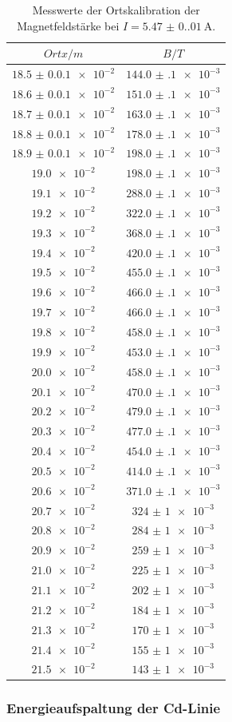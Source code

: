 \begin{table}[H]
	\centering
	\begin{tabular}{|c|c|} \hline
		$Ort x / m$           & $B / T$               \\ \hline
		$\num{18.5(0.01)e-2}$ & $\num{144.0(1)e-3}$   \\
		$\num{18.6(0.01)e-2}$ & $\num{151.0(1)e-3}$   \\
		$\num{18.7(0.01)e-2}$ & $\num{163.0(1)e-3}$   \\
		$\num{18.8(0.01)e-2}$ & $\num{178.0(1)e-3}$   \\
		$\num{18.9(0.01)e-2}$ & $\num{198.0(1)e-3}$   \\
		$\num{19.0e-2} $      & $ \num{198.0(1)e-3} $ \\
		$\num{19.1e-2} $      & $ \num{288.0(1)e-3} $ \\
		$\num{19.2e-2} $      & $ \num{322.0(1)e-3} $ \\
		$\num{19.3e-2} $      & $ \num{368.0(1)e-3} $ \\
		$\num{19.4e-2} $      & $ \num{420.0(1)e-3} $ \\
		$\num{19.5e-2} $      & $ \num{455.0(1)e-3} $ \\
		$\num{19.6e-2} $      & $ \num{466.0(1)e-3} $ \\
		$\num{19.7e-2} $      & $ \num{466.0(1)e-3} $ \\
		$\num{19.8e-2} $      & $ \num{458.0(1)e-3} $ \\
		$\num{19.9e-2} $      & $ \num{453.0(1)e-3} $ \\
		$\num{20.0e-2} $      & $ \num{458.0(1)e-3} $ \\
		$\num{20.1e-2} $      & $ \num{470.0(1)e-3} $ \\
		$\num{20.2e-2} $      & $ \num{479.0(1)e-3} $ \\
		$\num{20.3e-2} $      & $ \num{477.0(1)e-3} $ \\
		$\num{20.4e-2} $      & $ \num{454.0(1)e-3} $ \\
		$\num{20.5e-2} $      & $ \num{414.0(1)e-3} $ \\
		$\num{20.6e-2} $      & $ \num{371.0(1)e-3} $ \\
		$\num{20.7e-2} $      & $ \num{324(1)e-3} $   \\
		$\num{20.8e-2} $      & $ \num{284(1)e-3} $   \\
		$\num{20.9e-2} $      & $ \num{259(1)e-3} $   \\
		$\num{21.0e-2} $      & $ \num{225(1)e-3} $   \\
		$\num{21.1e-2} $      & $ \num{202(1)e-3} $   \\
		$\num{21.2e-2} $      & $ \num{184(1)e-3} $   \\
		$\num{21.3e-2} $      & $ \num{170(1)e-3} $   \\
		$\num{21.4e-2} $      & $ \num{155(1)e-3} $   \\
		$\num{21.5e-2} $      & $ \num{143(1)e-3} $   \\
		\hline
	\end{tabular}
	\caption{Messwerte der Ortskalibration der Magnetfeldstärke bei $I=\SI{5.47(0.01)}{\ampere}$.}
	\label{tab:ortskalibration}
\end{table}

\subsubsection{Energieaufspaltung der Cd-Linie} \label{sec:grossetab}



